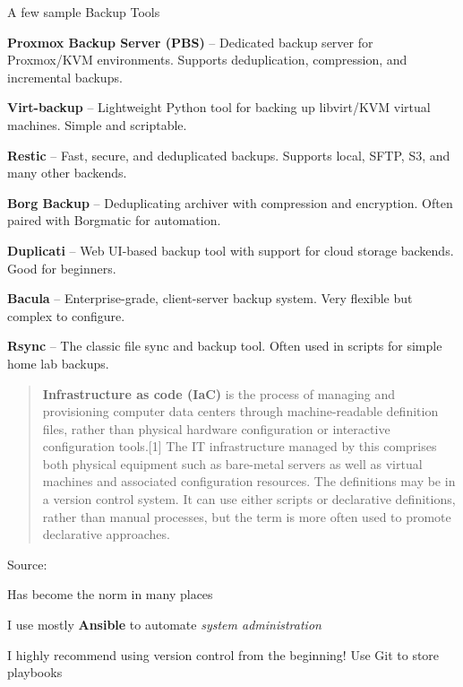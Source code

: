 \documentclass[Screen16to9,17pt]{foils}
\begin{document}

A few sample Backup Tools
\begin{list2}
  \item {\bf Proxmox Backup Server (PBS)} -- Dedicated backup server for Proxmox/KVM environments. Supports deduplication, compression, and incremental backups.
  \item {\bf Virt-backup} -- Lightweight Python tool for backing up libvirt/KVM virtual machines. Simple and scriptable.
  \item {\bf Restic} -- Fast, secure, and deduplicated backups. Supports local, SFTP, S3, and many other backends.
  \item {\bf Borg Backup} -- Deduplicating archiver with compression and encryption. Often paired with Borgmatic for automation.
  \item {\bf Duplicati} -- Web UI-based backup tool with support for cloud storage backends. Good for beginners.
  \item {\bf Bacula} -- Enterprise-grade, client-server backup system. Very flexible but complex to configure.
  \item {\bf Rsync} -- The classic file sync and backup tool. Often used in scripts for simple home lab backups.
\end{list2}




\begin{quote}
{\bf Infrastructure as code (IaC)} is the process of managing and provisioning computer data centers through machine-readable definition files, rather than physical hardware configuration or interactive configuration tools.[1] The IT infrastructure managed by this comprises both physical equipment such as bare-metal servers as well as virtual machines and associated configuration resources. The definitions may be in a version control system. It can use either scripts or declarative definitions, rather than manual processes, but the term is more often used to promote declarative approaches.
\end{quote}
Source: {\footnotesize
{}}

\begin{list2}
\item Has become the norm in many places
\item I use mostly {\bf Ansible} to automate \emph{system administration}
\item I highly recommend using version control from the beginning! Use Git to store playbooks
\end{list2}
\end{document}
